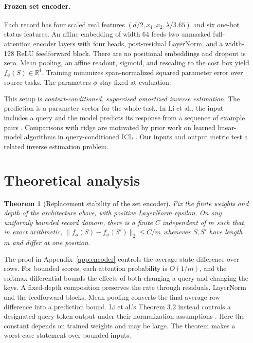 \documentclass[11pt,letterpaper]{article}
\newtheorem{theorem}{Theorem}
\newcommand{\norm}[1]{\lVert #1\rVert_2}
\newcommand{\tf}{f_\phi}
\begin{document}
\paragraph{Frozen set encoder.}
Each record has four scaled real features
\((d/2,x_1,x_2,\lambda/3.65)\) and six one-hot status features.
An affine embedding of width 64 feeds two unmasked full-attention
encoder layers with four heads, post-residual LayerNorm,
and a width-128 ReLU feedforward block. There are no positional
embeddings and dropout is zero. Mean pooling, an affine readout,
sigmoid, and rescaling to the cost box yield \(\tf(S)\in\mathbb R^4\).
Training minimizes span-normalized squared parameter error over source
tasks. The parameters \(\phi\) stay fixed at evaluation.

This setup is \emph{context-conditioned, supervised amortized inverse
estimation}. The prediction is a parameter vector for the whole task.
In Li et al., the input includes a query and the model predicts its
response from a sequence of example pairs \cite{li}. Comparisons with
ridge are motivated by prior work on learned linear-model algorithms
in query-conditioned ICL \cite{akyurek}. Our inputs and output metric
test a related inverse estimation problem.

\clearpage
\section{Theoretical analysis}
\begin{theorem}[Replacement stability of the set encoder]
\label{thm:upper}
Fix the finite weights and depth of the architecture above, with positive
LayerNorm epsilon. On any uniformly bounded record domain, there is a
finite \(C\) independent of \(m\) such that, in exact arithmetic,
\(\norm{\tf(S)-\tf(S')} \le C/m\) whenever \(S,S'\) have length \(m\)
and differ at one position.
\end{theorem}

The proof in Appendix~\ref{app:encoder} controls the average state
difference over rows. For bounded scores, each attention probability is
\(O(1/m)\), and the softmax differential bounds the effects of both
changing a query and changing the keys. A fixed-depth composition
preserves the rate through residuals, LayerNorm and the feedforward
blocks. Mean pooling converts the final average row difference into a
prediction bound. Li et al.'s Theorem 3.2 instead controls a designated
query-token output under their normalization assumptions \cite{li}.
Here the constant depends on trained weights and may be large.
The theorem makes a worst-case statement over bounded inputs.
\end{document}
